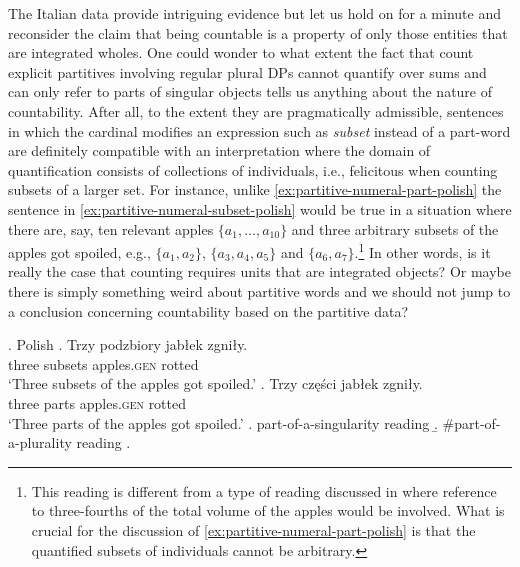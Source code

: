 The Italian data provide intriguing evidence but let us hold on for a minute and reconsider the claim that being countable is a property of only those entities that are integrated wholes. One could wonder to what extent the fact that count explicit partitives involving regular plural DPs cannot quantify over sums and can only refer to parts of singular objects tells us anything about the nature of countability. After all, to the extent they are pragmatically admissible, sentences in which the cardinal modifies an expression such as \textit{subset} instead of a part-word are definitely compatible with an interpretation where the domain of quantification consists of collections of individuals, i.e., felicitous when counting subsets of a larger set. For instance, unlike \ref{ex:partitive-numeral-part-polish} the sentence in \ref{ex:partitive-numeral-subset-polish} would be true in a situation where there are, say, ten relevant apples $\{a_1, \dots, a_{10}\}$ and three arbitrary subsets of the apples got spoiled, e.g., $\{a_1, a_2\}$, $\{a_3, a_4, a_5\}$ and $\{a_6, a_7\}$.\footnote{This reading is different from a type of reading discussed in  where reference to three-fourths of the total volume of the apples would be involved. What is crucial for the discussion of \ref{ex:partitive-numeral-part-polish} is that the quantified subsets of individuals cannot be arbitrary.} In other words, is it really the case that counting requires units that are integrated objects? Or maybe there is simply something weird about partitive words and we should not jump to a conclusion concerning countability based on the partitive data? 

\ex.\label{ex:partitive-numeral-subset-part-polish} Polish
\ag. Trzy podzbiory jabłek zgniły.\label{ex:partitive-numeral-subset-polish}\\
three subsets apples\textsc{.gen} rotted\\
`Three subsets of the apples got spoiled.'
\bg. Trzy części jabłek zgniły.\label{ex:partitive-numeral-part-polish}\\
three parts apples\textsc{.gen} rotted\\
`Three parts of the apples got spoiled.'
\a. part-of-a-singularity reading
\b. \#part-of-a-plurality reading
\z.

